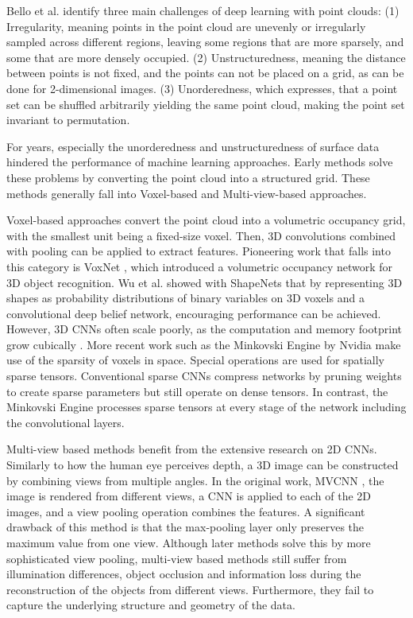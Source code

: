 \documentclass[class=article, crop=false]{standalone}
\begin{document}
Bello et al. \cite{Bello2020} identify three main challenges of deep learning with point clouds: (1) Irregularity, meaning points in the point cloud are unevenly or irregularly sampled across different regions, leaving some regions that are more sparsely, and some that are more densely occupied. (2) Unstructuredness, meaning the distance between points is not fixed, and the points can not be placed on a grid, as can be done for 2-dimensional images. (3) Unorderedness, which expresses, that a point set can be shuffled arbitrarily yielding the same point cloud, making the point set invariant to permutation.

For years, especially the unorderedness and unstructuredness of surface data hindered the performance of machine learning approaches. Early methods solve these problems by converting the point cloud into a structured grid. These methods generally fall into Voxel-based and Multi-view-based approaches.

Voxel-based approaches convert the point cloud into a volumetric occupancy grid, with the smallest unit being a fixed-size voxel. Then, 3D convolutions combined with pooling can be applied to extract features. Pioneering work that falls into this category is VoxNet \cite{Maturana2015}, which introduced a volumetric occupancy network for 3D object recognition. Wu et al. showed with ShapeNets \cite{Wu2015} that by representing 3D shapes as probability distributions of binary variables on 3D voxels and a convolutional deep belief network, encouraging performance can be achieved. However, 3D CNNs often scale poorly, as the computation and memory footprint grow cubically \cite{Guo2021}. More recent work such as the Minkovski Engine \cite{DBLP:journals/corr/abs-1904-08755} by Nvidia make use of the sparsity of voxels in space. Special operations are used for spatially sparse tensors. Conventional sparse CNNs compress networks by pruning weights to create sparse parameters but still operate on dense tensors. In contrast, the Minkovski Engine processes sparse tensors at every stage of the network including the convolutional layers.

Multi-view based methods benefit from the extensive research on 2D CNNs. Similarly to how the human eye perceives depth, a 3D image can be constructed by combining views from multiple angles. In the original work, MVCNN \cite{mvcnn}, the image is rendered from different views, a CNN is applied to each of the 2D images, and a view pooling operation combines the features. A significant drawback of this method is that the max-pooling layer only preserves the maximum value from one view. Although later methods solve this by more sophisticated view pooling, multi-view based methods still suffer from illumination differences, object occlusion and information loss during the reconstruction of the objects from different views. Furthermore, they fail to capture the underlying structure and geometry of the data.
\end{document}
